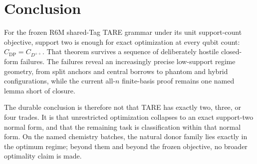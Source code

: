 \section{Conclusion}

For the frozen R6M shared-Tag TARE grammar under its unit support-count objective, support two is enough for exact optimization at every qubit count: $C_{\mathrm{DP}}=C_{D^{++}}$. That theorem survives a sequence of deliberately hostile closed-form failures. The failures reveal an increasingly precise low-support regime geometry, from split anchors and central borrows to phantom and hybrid configurations, while the current all-$n$ finite-basis proof remains one named lemma short of closure.

The durable conclusion is therefore not that TARE has exactly two, three, or four trades. It is that unrestricted optimization collapses to an exact support-two normal form, and that the remaining task is classification within that normal form. On the named chemistry batches, the natural donor family lies exactly in the optimum regime; beyond them and beyond the frozen objective, no broader optimality claim is made.